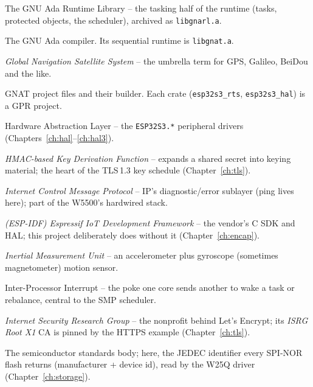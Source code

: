 \begin{description}[style=nextline, leftmargin=0pt]
\item[GNARL] The GNU Ada Runtime Library -- the tasking half of the runtime
  (tasks, protected objects, the scheduler), archived as \texttt{libgnarl.a}.

\item[GNAT] The GNU Ada compiler. Its sequential runtime is \texttt{libgnat.a}.

\item[GNSS] \emph{Global Navigation Satellite System} -- the umbrella term for GPS, Galileo, BeiDou and the like.

\item[GPR / \texttt{gprbuild}] GNAT project files and their builder. Each crate
  (\texttt{esp32s3\_rts}, \texttt{esp32s3\_hal}) is a GPR project.

\item[HAL] Hardware Abstraction Layer -- the \texttt{ESP32S3.*} peripheral
  drivers (Chapters~\ref{ch:hal}--\ref{ch:hal3}).

\item[HKDF] \emph{HMAC-based Key Derivation Function} -- expands a shared secret into keying material; the heart of the TLS\,1.3 key schedule (Chapter~\ref{ch:tls}).

\item[ICMP] \emph{Internet Control Message Protocol} -- IP's diagnostic/error sublayer (ping lives here); part of the W5500's hardwired stack.

\item[IDF] \emph{(ESP-IDF) Espressif IoT Development Framework} -- the vendor's C SDK and HAL; this project deliberately does without it (Chapter~\ref{ch:encap}).

\item[IMU] \emph{Inertial Measurement Unit} -- an accelerometer plus gyroscope (sometimes magnetometer) motion sensor.

\item[IPI] Inter-Processor Interrupt -- the poke one core sends another to wake a
  task or rebalance, central to the SMP scheduler.

\item[ISRG] \emph{Internet Security Research Group} -- the nonprofit behind Let's Encrypt; its \emph{ISRG Root X1} CA is pinned by the HTTPS example (Chapter~\ref{ch:tls}).

\item[JEDEC] The semiconductor standards body; here, the JEDEC identifier every SPI-NOR flash returns (manufacturer + device id), read by the W25Q driver (Chapter~\ref{ch:storage}).


\end{description}
